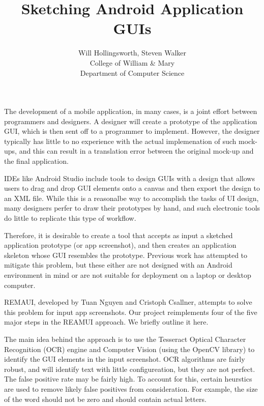 \documentclass[12pt,twocolumn]{article}
\begin{document}
\title{Sketching Android Application GUIs}

\author{Will Hollingsworth, Steven Walker\\
College of William \& Mary\\ Department of Computer Science
}

\maketitle
\thispagestyle{empty}

The development of a mobile application, in many cases, is a joint effort
between programmers and designers.  A designer will create a prototype of the
application GUI, which is then sent off to a programmer to implement.  However,
the designer typically has little to no experience with the actual implemenation
of such mock-ups, and this can result in a translation error between the
original mock-up and the final application.

IDEs like Android Studio include tools to design GUIs with a design that allows
users to drag and drop GUI elements onto a canvas and then export the design to
an XML file.  While this is a reasonalbe way to accomplish the tasks of UI
design, many designers perfer to draw their prototypes by hand, and such
electronic tools do little to replicate this type of workflow.

Therefore, it is desirable to create a tool that accepts as input a sketched
application prototype (or app screenshot), and then creates an application
skeleton whose GUI resembles the prototype.  Previous work has attempted to
mitigate this problem\cite{sketchit,mobidev}, but these either are not designed
with an Android environment in mind or are not suitable for deployment on a
laptop or desktop computer.

REMAUI\cite{remaui}, developed by Tuan Nguyen and Cristoph Csallner, attempts to
solve this problem for input app screenshots.  Our project reimplements four of
the five major steps in the REAMUI approach.  We briefly outline it here.

The main idea behind the approach is to use the Tesseract Optical Character
Recognition (OCR) engine and Computer Vision (using the OpenCV library) to
identify the GUI elements in the input screenshot.  OCR algorithms are fairly
robust, and will identify text with little configureation, but they are not
perfect.  The false positive rate may be fairly high.  To account for this,
certain heurstics are used to remove likely false positives from consideration.
For example, the size of the word should not be zero and should contain actual
letters.
\end{document}
